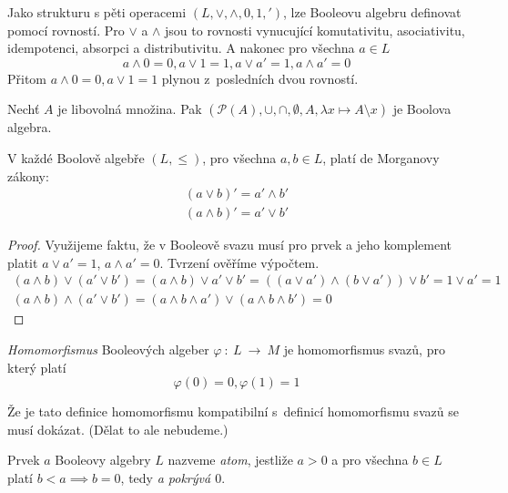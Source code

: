 Jako strukturu s pěti operacemi $(L, \vee, \wedge, 0, 1, {'})$,
lze Booleovu algebru definovat pomocí rovností.
Pro $\vee$ a $\wedge$ jsou to rovnosti vynucující
komutativitu, asociativitu, idempotenci,
absorpci a distributivitu. A nakonec pro všechna $a \in L$
$$a \wedge 0 = 0, a \vee 1 = 1, a \vee a' = 1, a \wedge a' = 0$$
Přitom $a \wedge 0 = 0, a \vee 1 = 1$ plynou z~posledních dvou rovností.

\begin{example}
    Nechť $A$ je libovolná množina.
    Pak $(\mathcal{P}(A), \cup, \cap, \emptyset, A,
        \lambda x \mapsto A \setminus x)$ je Boolova algebra.
\end{example}

\begin{claim}
    V každé Boolově algebře $(L, \leq)$, pro všechna $a,b \in L$,
    platí de Morganovy zákony:
    \begin{align*}
    (a \vee b)' = a' \wedge b'\\
    (a \wedge b)' = a' \vee b'
    \end{align*}
\end{claim}

\begin{proof}
    Využijeme faktu, že v Booleově svazu musí pro prvek a jeho
    komplement
    platit $a \vee a' = 1$, $a \wedge a' = 0$. Tvrzení ověříme výpočtem.
    \begin{gather*}
    (a \wedge b) \vee (a' \vee b') = (a \wedge b) \vee a' \vee b' =
        ((a \vee a') \wedge (b \vee a')) \vee b' = 1 \vee a' = 1\\
    (a \wedge b) \wedge (a' \vee b') =
        (a \wedge b \wedge a') \vee (a \wedge b \wedge b') = 0
    \end{gather*}
\end{proof}

\begin{definition}[Homomorfismus]
    {\em Homomorfismus} Booleových algeber $\varphi~\colon~L~\to~M$
    je homomorfismus svazů, pro který platí
    \[
    \varphi(0) = 0, \varphi(1) = 1
    \]
\end{definition}

Že je tato definice homomorfismu kompatibilní s~definicí homomorfismu
svazů se musí dokázat. (Dělat to ale nebudeme.)

\begin{definition}[Atom]
    Prvek $a$ Booleovy algebry $L$ nazveme {\em atom}, jestliže
    $a > 0$ a pro všechna $b \in L$ platí $b < a \implies b = 0$,
    tedy {\em a pokrývá $0$}.
\end{definition}


